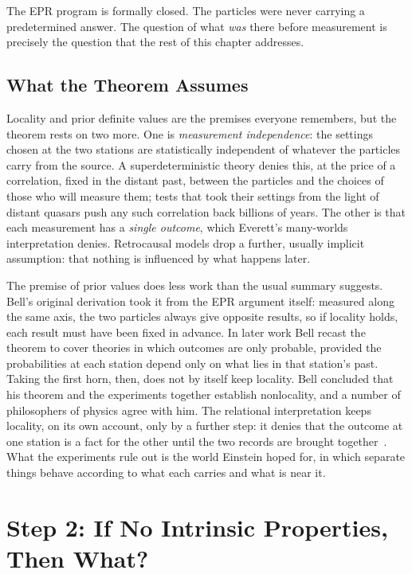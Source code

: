 The EPR program is formally closed.
The particles were never carrying a predetermined answer.
The question of what \emph{was} there before measurement is precisely the question
that the rest of this chapter addresses.

\subsection*{What the Theorem Assumes}

Locality and prior definite values are the premises everyone remembers, but the
theorem rests on two more.
One is \emph{measurement independence}: the settings chosen at the two stations
are statistically independent of whatever the particles carry from the source.
A superdeterministic theory denies this, at the price of a correlation, fixed in
the distant past, between the particles and the choices of those who will
measure them; tests that took their settings from the light of distant quasars
push any such correlation back billions of years.
The other is that each measurement has a \emph{single outcome}, which Everett's
many-worlds interpretation denies.
Retrocausal models drop a further, usually implicit assumption: that nothing is
influenced by what happens later.

The premise of prior values does less work than the usual summary suggests.
Bell's original derivation took it from the EPR argument itself: measured along
the same axis, the two particles always give opposite results, so if locality
holds, each result must have been fixed in advance.
In later work Bell recast the theorem to cover theories in which outcomes are
only probable, provided the probabilities at each station depend only on what
lies in that station's past.
Taking the first horn, then, does not by itself keep locality.
Bell concluded that his theorem and the experiments together establish
nonlocality, and a number of philosophers of physics agree with him.
The relational interpretation keeps locality, on its own account, only by a
further step: it denies that the outcome at one station is a fact for the other
until the two records are brought together~\citep{Rovelli2021}.
What the experiments rule out is the world Einstein hoped for, in which separate
things behave according to what each carries and what is near it.


\section{Step 2: If No Intrinsic Properties, Then What?}
\label{sec:ch5-step2}

